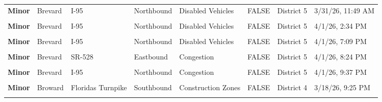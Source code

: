 \documentclass[
]{article}
\begin{document}
\begin{longtable}[t]{>{\raggedright\arraybackslash}p{1.5cm}>{\raggedright\arraybackslash}p{2.5cm}>{\raggedright\arraybackslash}p{3cm}>{\raggedright\arraybackslash}p{1.8cm}>{\raggedright\arraybackslash}p{2.5cm}lll}
\textbf{Minor} & Brevard & I-95 & Northbound & Disabled Vehicles & FALSE & District 5 & 3/31/26, 11:49 AM\\
\textbf{\cellcolor{gray!10}{Minor}} & \cellcolor{gray!10}{Brevard} & \cellcolor{gray!10}{I-95} & \cellcolor{gray!10}{Northbound} & \cellcolor{gray!10}{Disabled Vehicles} & \cellcolor{gray!10}{FALSE} & \cellcolor{gray!10}{District 5} & \cellcolor{gray!10}{3/31/26, 10:20 PM}\\
\textbf{Minor} & Brevard & I-95 & Northbound & Disabled Vehicles & FALSE & District 5 & 4/1/26, 2:34 PM\\
\addlinespace
\textbf{\cellcolor{gray!10}{Minor}} & \cellcolor{gray!10}{Brevard} & \cellcolor{gray!10}{SR-405} & \cellcolor{gray!10}{Eastbound} & \cellcolor{gray!10}{Congestion} & \cellcolor{gray!10}{FALSE} & \cellcolor{gray!10}{District 5} & \cellcolor{gray!10}{4/1/26, 6:29 PM}\\
\textbf{Minor} & Brevard & I-95 & Northbound & Disabled Vehicles & FALSE & District 5 & 4/1/26, 7:09 PM\\
\textbf{\cellcolor{gray!10}{Minor}} & \cellcolor{gray!10}{Brevard} & \cellcolor{gray!10}{I-95} & \cellcolor{gray!10}{Northbound} & \cellcolor{gray!10}{Disabled Vehicles} & \cellcolor{gray!10}{FALSE} & \cellcolor{gray!10}{District 5} & \cellcolor{gray!10}{4/1/26, 7:10 PM}\\
\textbf{Minor} & Brevard & SR-528 & Eastbound & Congestion & FALSE & District 5 & 4/1/26, 8:24 PM\\
\textbf{\cellcolor{gray!10}{Minor}} & \cellcolor{gray!10}{Brevard} & \cellcolor{gray!10}{SR-528} & \cellcolor{gray!10}{Westbound} & \cellcolor{gray!10}{Congestion} & \cellcolor{gray!10}{FALSE} & \cellcolor{gray!10}{District 5} & \cellcolor{gray!10}{4/1/26, 9:02 PM}\\
\addlinespace
\textbf{Minor} & Brevard & I-95 & Northbound & Congestion & FALSE & District 5 & 4/1/26, 9:37 PM\\
\textbf{\cellcolor{gray!10}{Minor}} & \cellcolor{gray!10}{Brevard} & \cellcolor{gray!10}{I-95} & \cellcolor{gray!10}{Northbound} & \cellcolor{gray!10}{Disabled Vehicles} & \cellcolor{gray!10}{FALSE} & \cellcolor{gray!10}{District 5} & \cellcolor{gray!10}{4/1/26, 9:17 PM}\\
\textbf{Minor} & Broward & Floridas Turnpike & Southbound & Construction Zones & FALSE & District 4 & 3/18/26, 9:25 PM\\
\textbf{\cellcolor{gray!10}{Minor}} & \cellcolor{gray!10}{Broward} & \cellcolor{gray!10}{Sunrise Blvd} & \cellcolor{gray!10}{Eastbound} & \cellcolor{gray!10}{Closures} & \cellcolor{gray!10}{FALSE} & \cellcolor{gray!10}{District 4} & \cellcolor{gray!10}{3/19/26, 7:00 AM}\\

\end{longtable}
\end{document}
